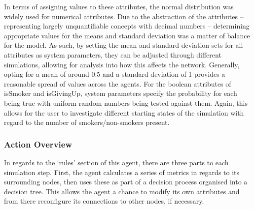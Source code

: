 \documentclass[]{report}
\begin{document}
In terms of assigning values to these attributes, the normal distribution was widely used for numerical attributes. Due to the abstraction of the attributes – representing largely unquantifiable concepts with decimal numbers – determining appropriate values for the means and standard deviation was a matter of balance for the model. As such, by setting the mean and standard deviation sets for all attributes as system parameters, they can be adjusted through different simulations, allowing for analysis into how this affects the network.  Generally, opting for a mean of around 0.5 and a standard deviation of 1 provides a reasonable spread of values across the agents. For the boolean attributes of isSmoker and isGivingUp, system parameters specify the probability for each being true with uniform random numbers being tested against them. Again, this allows for the user to investigate different starting states of the simulation with regard to the number of smokers/non-smokers present.
\subsubsection{Action Overview}
In regards to the `rules' section of this agent, there are three parts to each simulation step. First, the agent calculates a series of metrics in regards to its surrounding nodes, then uses these as part of a decision process organised into a decision tree. This allows the agent a chance to modify its own attributes and from there reconfigure its connections to other nodes, if necessary. 
\end{document}
